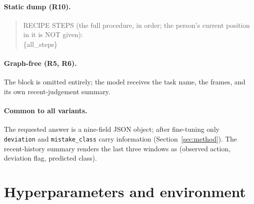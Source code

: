 \documentclass[10pt,twocolumn]{article}
\begin{document}
\paragraph{Static dump (R10).}
\begin{quote}\footnotesize\ttfamily
RECIPE STEPS (the full procedure, in order; the person's current position in it
is NOT given):\\
\{all\_steps\}
\end{quote}

\paragraph{Graph-free (R5, R6).} The block is omitted entirely; the model
receives the task name, the frames, and its own recent-judgement summary.

\paragraph{Common to all variants.} The requested answer is a nine-field JSON
object; after fine-tuning only \texttt{deviation} and \texttt{mistake\_class}
carry information (Section~\ref{sec:method}). The recent-history summary renders
the last three windows as (observed action, deviation flag, predicted class).

\section{Hyperparameters and environment}
\label{app:hyper}
\end{document}

